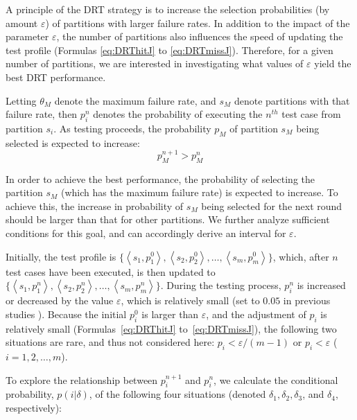 \documentclass[10pt,journal,compsoc]{IEEEtran}
\begin{document}
A principle of the DRT strategy is to increase the selection probabilities (by amount $\varepsilon$) of partitions with larger failure rates.
In addition to the impact of the parameter $\varepsilon$, the number of partitions also influences the speed of updating the test profile (Formulas \ref{eq:DRThitJ} to \ref{eq:DRTmissJ}).
Therefore, for a given number of partitions, we are interested in investigating what values of $\varepsilon$ yield the best DRT performance.

Letting $\theta_M$ denote the maximum failure rate, and $s_M$ denote partitions with that failure rate, then $p_i^n$ denotes the probability of executing the $n^{th}$ test case from partition $s_i$.
As testing proceeds, the probability $p_M$ of partition $s_M$ being selected is expected to increase:
\begin{equation}
    \label{eq:exception}
    p_M^{n + 1} > p_M^{n}
\end{equation}

In order to achieve the best performance, the probability of selecting the partition $s_M$ (which has the maximum failure rate) is expected to increase. To achieve this, the increase in probability of $s_M$ being selected for the next round should be larger than that for other partitions. We further analyze sufficient conditions for this goal, and can accordingly derive an interval for $\varepsilon$.

Initially, the test profile is
$\{ \left \langle s_1,p_1^0 \right \rangle, \left \langle s_2,p_2^0 \right \rangle, \ldots, \left \langle s_m,p_m^0 \right \rangle\}$,
which, after $n$ test cases have been executed,  is then updated to
$\{ \left \langle s_1,p_1^n \right \rangle, \left \langle s_2,p_2^n \right \rangle, \ldots, \left \langle s_m,p_m^n \right \rangle\}$.
During the testing process, $p_i^n$ is increased or decreased by the value $\varepsilon$, which is relatively small (set to $0.05$ in previous studies \cite{Lv2011,li2015}).
Because the initial $p_i^0$ is larger than $\varepsilon$, and the adjustment of $p_i$ is relatively small (Formulas~\ref{eq:DRThitJ} to~\ref{eq:DRTmissJ}), the following two situations are rare, and thus not considered here:
$p_i < \varepsilon / (m - 1)$ or
$p_i < \varepsilon$ ($i = 1, 2, \ldots, m$).

To explore the relationship between $p_i^{n + 1}$ and $p_i^{n}$, we calculate the conditional probability, $p(i|\delta)$, of the following four situations (denoted $\delta_1, \delta_2, \delta_3$, and $\delta_4$, respectively):
\end{document}
